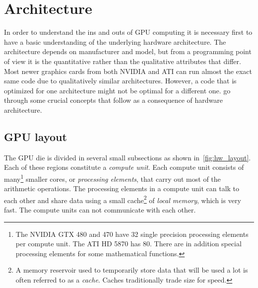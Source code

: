 \documentclass[11pt,twoside]{report}
\begin{document}


\section{Architecture}
In order to understand the ins and outs of GPU computing it is necessary first to have a basic understanding of the underlying hardware architecture. The architecture depends on manufacturer and model, but from a programming point of view it is  the quantitative rather than the qualitative attributes that differ. Most newer graphics cards from both NVIDIA and ATI can run almost the exact same code due to qualitatively similar architectures. However, a code that is optimized for one architecture might not be optimal for a different one.   go through some crucial concepts that follow as a consequence of hardware architecture.

\subsection{GPU layout}
\label{sec:gpulayout}
The GPU die is divided in several small subsections as shown in~\cref{fig:hw_layout}. Each of these regions constitute a {\it compute unit}. Each compute unit consists of many\footnote{The NVIDIA GTX 480 and 470 have 32 single precision processing elements per compute unit. The ATI HD 5870 has 80. There are in addition special processing elements for some mathematical functions.} smaller cores, or {\it processing elements}, that carry out most of the arithmetic operations. The processing elements in a compute unit can talk to each other and share data using a small cache\footnote{A memory reservoir used to temporarily store data that will be used a lot is often referred to as a {\it cache}. Caches traditionally trade size for speed.} of {\it local memory}, which is very fast.  The compute units can not communicate with each other. %
\end{document}
